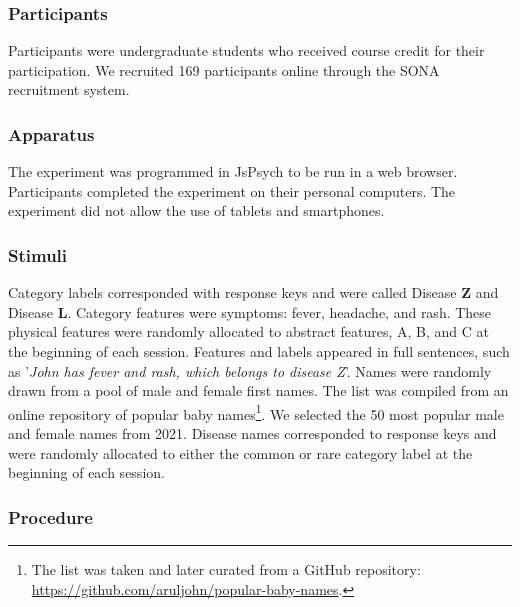 \documentclass[10pt,letterpaper]{article}
\begin{document}
\subsubsection{Participants}

Participants were undergraduate students who received course credit for their participation.
We recruited 169 participants online through the SONA recruitment system.

\subsubsection{Apparatus}

The experiment was programmed in JsPsych \cite{deleeuw2015JsPsych} to be run in a web browser.
Participants completed the experiment on their personal computers.
The experiment did not allow the use of tablets and smartphones.

\subsubsection{Stimuli}

Category labels corresponded with response keys and were called Disease \textbf{Z} and Disease \textbf{L}.
Category features were symptoms: fever, headache, and rash.
These physical features were randomly allocated to abstract features, A, B, and C at the beginning of each session.
Features and labels appeared in full sentences, such as '\textit{John has fever and rash, which belongs to disease Z}'.
Names were randomly drawn from a pool of male and female first names.
The list was compiled from an online repository of popular baby names\footnote{The list was taken and later curated from a GitHub repository: \href{https://github.com/aruljohn/popular-baby-names}{https://github.com/aruljohn/popular-baby-names}.}.
We selected the 50 most popular male and female names from 2021.
Disease names corresponded to response keys and were randomly allocated to either the common or rare category label at the beginning of each session.

\subsubsection{Procedure}
\end{document}
